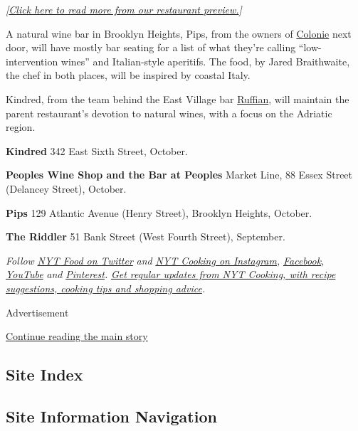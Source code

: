 \emph{{[}}\href{https://www.nytimes3xbfgragh.onion/2019/09/03/dining/fall-restaurant-preview-nyc.html}{\emph{Click
here to read more from our restaurant preview.}}\emph{{]}}

A natural wine bar in Brooklyn Heights, Pips, from the owners of
\href{http://colonienyc.com/}{Colonie} next door, will have mostly bar
seating for a list of what they're calling ``low-intervention wines''
and Italian-style aperitifs. The food, by Jared Braithwaite, the chef in
both places, will be inspired by coastal Italy.

Kindred, from the team behind the East Village bar
\href{http://ruffiannyc.com/}{Ruffian}, will maintain the parent
restaurant's devotion to natural wines, with a focus on the Adriatic
region.

\textbf{Kindred} 342 East Sixth Street, October.

\textbf{Peoples Wine Shop and the Bar at Peoples} Market Line, 88 Essex
Street (Delancey Street), October.

\textbf{Pips} 129 Atlantic Avenue (Henry Street), Brooklyn Heights,
October.

\textbf{The Riddler} 51 Bank Street (West Fourth Street), September.

\emph{Follow} \href{https://twitter.com/nytfood}{\emph{NYT Food on
Twitter}} \emph{and}
\href{https://www.instagram.com/nytcooking/}{\emph{NYT Cooking on
Instagram}}\emph{,}
\href{https://www.facebookcorewwwi.onion/nytcooking/}{\emph{Facebook}}\emph{,}
\href{https://www.youtube.com/nytcooking}{\emph{YouTube}} \emph{and}
\href{https://www.pinterest.com/nytcooking/}{\emph{Pinterest}}\emph{.}
\href{https://www.nytimes3xbfgragh.onion/newsletters/cooking}{\emph{Get
regular updates from NYT Cooking, with recipe suggestions, cooking tips
and shopping advice}}\emph{.}

Advertisement

\protect\hyperlink{after-bottom}{Continue reading the main story}

\hypertarget{site-index}{%
\subsection{Site Index}\label{site-index}}

\hypertarget{site-information-navigation}{%
\subsection{Site Information
Navigation}\label{site-information-navigation}}

